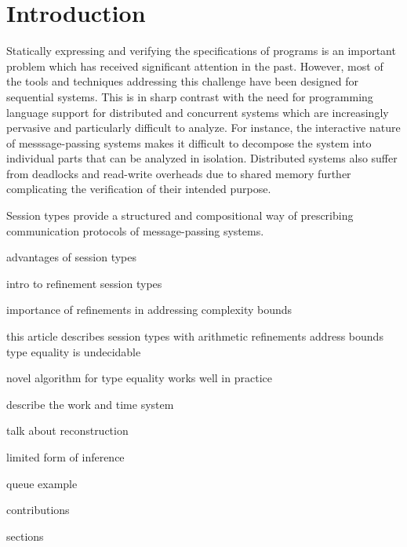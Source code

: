 \section{Introduction}
Statically expressing and verifying the specifications of
programs is an important problem which has received significant
attention in the past. However, most of the tools and techniques
addressing this challenge have been designed for sequential
systems. This is in sharp contrast with the need for programming
language support for distributed and concurrent systems which
are increasingly pervasive and particularly difficult to analyze.
For instance, the interactive nature of messsage-passing systems
makes it difficult to decompose the system into individual parts
that can be analyzed in isolation. Distributed systems also suffer
from deadlocks and read-write overheads due to shared memory
further complicating the verification of their intended purpose.

Session types provide a structured and compositional way of
prescribing communication protocols of message-passing systems.

advantages of session types

intro to refinement session types

importance of refinements in addressing complexity bounds

this article describes session types with arithmetic refinements
address bounds
type equality is undecidable

novel algorithm for type equality
works well in practice

describe the work and time system

talk about reconstruction

limited form of inference

queue example

contributions

sections